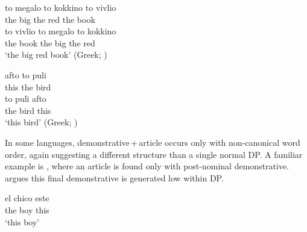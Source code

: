 \documentclass[output=paper]{langscibook}
\begin{document}
\ea \label{ex:bigred}
\ea
\gll to megalo to kokkino to vivlio\\
     the big the red the book\\ %

\ex
\gll to vivlio to megalo to kokkino\\
    the book the big the red\\
\glt `the big red book' \hfill (Greek; \citealt{Alexiadou.Wilder1998}) %
\z




\ex \label{bird}
\ea
\gll afto to puli\\
     this the bird\\ %

\ex
\gll to puli afto\\
    the bird this\\
\glt `this bird' \hfill (Greek; \citealt{Joseph2019})
\z
\z


\noindent In some languages, demonstrative\,+\,article occurs only with non-canonical word order, again suggesting a different structure than a single normal DP. A familiar example is , where an article is found only with post-nominal demonstrative. \citet{Giusti2002} argues this final demonstrative is generated low within DP.




\ea \label{ex:Spanish}
\ea
\gll el chico  este \\
     the boy  this\\
     \glt `this  boy'
\end{document}
